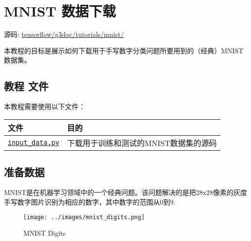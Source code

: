 

\section{MNIST 数据下载 }\label{mnist-ux6570ux636eux4e0bux8f7d}

源码:
\href{https://tensorflow.googlesource.com/tensorflow/+/master/tensorflow/g3doc/tutorials/mnist/}{tensorflow/g3doc/tutorials/mnist/}

本教程的目标是展示如何下载用于手写数字分类问题所要用到的（经典）MNIST数据集。

\subsection{教程 文件 }\label{ux6559ux7a0b-ux6587ux4ef6}

本教程需要使用以下文件：

\begin{longtable}[c]{@{}ll@{}}
\toprule
\begin{minipage}[b]{0.05\columnwidth}\raggedright\strut
文件
\strut\end{minipage} &
\begin{minipage}[b]{0.05\columnwidth}\raggedright\strut
目的
\strut\end{minipage}\tabularnewline
\midrule
\endhead
\begin{minipage}[t]{0.05\columnwidth}\raggedright\strut
\href{https://tensorflow.googlesource.com/tensorflow/+/master/tensorflow/g3doc/tutorials/mnist/input_data.py}{\texttt{input\_data.py}}
\strut\end{minipage} &
\begin{minipage}[t]{0.05\columnwidth}\raggedright\strut
下载用于训练和测试的MNIST数据集的源码
\strut\end{minipage}\tabularnewline
\bottomrule
\end{longtable}

\subsection{准备数据 }\label{ux51c6ux5907ux6570ux636e}

MNIST是在机器学习领域中的一个经典问题。该问题解决的是把28x28像素的灰度手写数字图片识别为相应的数字，其中数字的范围从0到9.

\begin{figure}[htbp]
\centering
\texttt{[image: ../images/mnist\_digits.png]}
\caption{MNIST Digits}
\end{figure}

